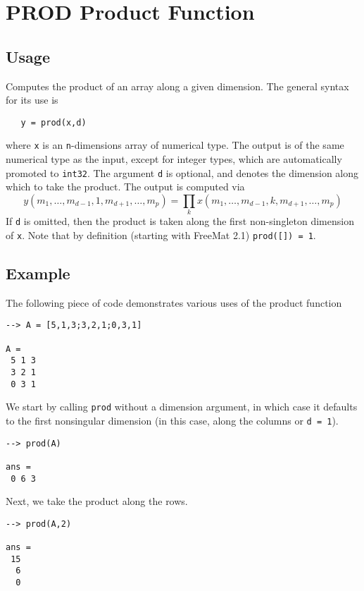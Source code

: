 \section{PROD Product Function}

\subsection{Usage}

Computes the product of an array along a given dimension.  The general
syntax for its use is
\begin{verbatim}
   y = prod(x,d)
\end{verbatim}
where \verb|x| is an \verb|n|-dimensions array of numerical type.
The output is of the same numerical type as the input, except 
for integer types, which are automatically promoted to \verb|int32|.
 The argument \verb|d| is optional, and denotes the dimension along 
which to take the product.  The output is computed via
\[
  y(m_1,\ldots,m_{d-1},1,m_{d+1},\ldots,m_{p}) = 
    \prod_{k} x(m_1,\ldots,m_{d-1},k,m_{d+1},\ldots,m_{p})
\]
If \verb|d| is omitted, then the product is taken along the 
first non-singleton dimension of \verb|x|. Note that by definition
(starting with FreeMat 2.1) \verb|prod([]) = 1|.
\subsection{Example}

The following piece of code demonstrates various uses of the product
function
\begin{verbatim}
--> A = [5,1,3;3,2,1;0,3,1]

A = 
 5 1 3 
 3 2 1 
 0 3 1 
\end{verbatim}
We start by calling \verb|prod| without a dimension argument, in which case it defaults to the first nonsingular dimension (in this case, along the columns or \verb|d = 1|).
\begin{verbatim}
--> prod(A)

ans = 
 0 6 3 
\end{verbatim}
Next, we take the product along the rows.
\begin{verbatim}
--> prod(A,2)

ans = 
 15 
  6 
  0 
\end{verbatim}
